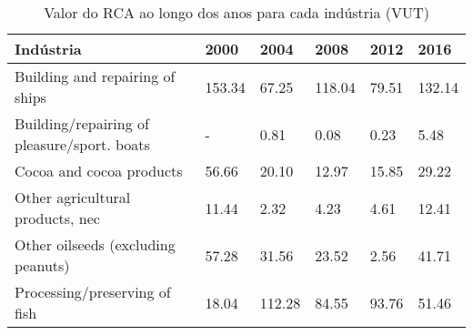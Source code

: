 \begin{table}
\centering
\caption{Valor do RCA ao longo dos anos para cada indústria (VUT)}
\begin{tabular}{p{6cm}p{1.5cm}p{1.5cm}p{1.5cm}p{1.5cm}p{1.5cm}}
\toprule
                                  Indústria &   2000 &   2004 &   2008 &  2012 &   2016 \\
\midrule
            Building and repairing of ships & 153.34 &  67.25 & 118.04 & 79.51 & 132.14 \\
Building/repairing of pleasure/sport. boats &      - &   0.81 &   0.08 &  0.23 &   5.48 \\
                   Cocoa and cocoa products &  56.66 &  20.10 &  12.97 & 15.85 &  29.22 \\
           Other agricultural products, nec &  11.44 &   2.32 &   4.23 &  4.61 &  12.41 \\
         Other oilseeds (excluding peanuts) &  57.28 &  31.56 &  23.52 &  2.56 &  41.71 \\
              Processing/preserving of fish &  18.04 & 112.28 &  84.55 & 93.76 &  51.46 \\
\bottomrule
\end{tabular}
\end{table}
